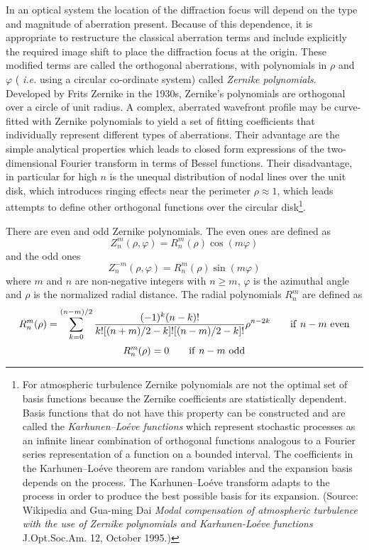 \documentclass{article}
\begin{document}
In an optical system the location of the diffraction focus will depend
on the type and magnitude of aberration present. Because of this
dependence, it is appropriate to restructure the classical aberration
terms and include explicitly the required image shift to place the
diffraction focus at the origin. These modified terms are called the
orthogonal aberrations, with polynomials in $\rho$ and $\varphi$ ({\it
  i.e.} using a circular co-ordinate system) called
{\it Zernike polynomials}. Developed by Frits Zernike in the 1930s,
 Zernike's polynomials are orthogonal over a circle of unit radius. A complex, 
aberrated wavefront profile may be curve-fitted with Zernike polynomials to 
yield a set of fitting coefficients that individually represent different 
types of aberrations. Their advantage are the simple analytical
properties which leads to closed form expressions of the
two-dimensional Fourier transform in terms of Bessel functions. 
Their disadvantage, in particular for high $n$ is the unequal
distribution of nodal lines over the unit disk, which introduces
ringing effects near the perimeter $\rho\approx 1$, which leads
attempts to define other orthogonal functions over the circular 
disk\footnote{For atmospheric turbulence
  Zernike polynomials are not the optimal set of basis functions
  because the Zernike coefficients are statistically dependent. Basis
  functions that do not have this property can be constructed and are
  called the {\it Karhunen--Lo{\'e}ve functions} which represent
stochastic processes as an infinite linear combination of orthogonal
functions analogous to a Fourier series representation of a function
on a bounded interval. The coefficients in the Karhunen--Lo{\'e}ve
theorem are random variables and the expansion basis depends on the
process. The Karhunen--Lo{\'e}ve transform adapts to the process in 
order to produce the best possible basis for its expansion. (Source: 
Wikipedia and Gua-ming Dai {\it Modal compensation of atmospheric
  turbulence with the use of Zernike polynomials and
  Karhunen-Lo{\'e}ve functions} J.Opt.Soc.Am. 12, October 1995.)}.

There are even and odd Zernike polynomials. The even ones are defined as
\[
Z_n^m(\rho,\varphi)=R_n^m(\rho)\cos(m\varphi)
\]
and the odd ones
\[
Z_n^{-m}(\rho,\varphi)=R_n^m(\rho)\sin(m\varphi)
\]
where $m$ and $n$ are non-negative integers with $n\ge m$, $\varphi$ is the
azimuthal angle and $\rho$ is the normalized radial distance. The radial 
polynomials $R_n^m$ are defined as
\[
R_n^m(\rho)=\sum_{k=0}^{(n-m)/2}{(-1)^k(n-k)!\over 
   k![{(n+m)/2}-k]![{(n-m)/2}-k]!}\rho^{n-2k}\qquad{\rm if}~n-m~{\rm even}
\]
\[
R_n^m(\rho)=0\qquad{\rm if}~n-m~{\rm odd}
\]
\end{document}
